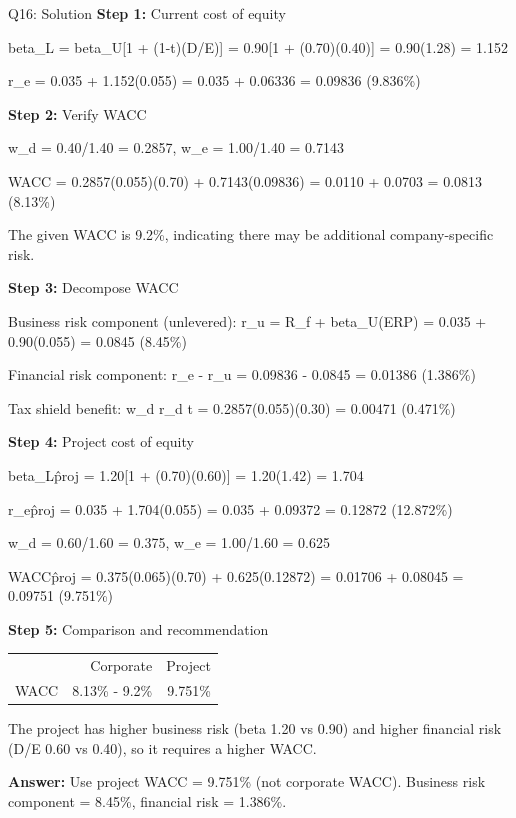 \documentclass{beamer}
\renewcommand{\scriptsize}{\fontsize{6pt}{7pt}\selectfont}
\begin{document}
	\begin{frame}{Q16: Solution}
		\scriptsize
		\textbf{Step 1:} Current cost of equity
		
		beta\_L = beta\_U[1 + (1-t)(D/E)] = 0.90[1 + (0.70)(0.40)] = 0.90(1.28) = 1.152
		
		r\_e = 0.035 + 1.152(0.055) = 0.035 + 0.06336 = 0.09836 (9.836\%)
		
		\vspace{2pt}
		\textbf{Step 2:} Verify WACC
		
		w\_d = 0.40/1.40 = 0.2857, w\_e = 1.00/1.40 = 0.7143
		
		WACC = 0.2857(0.055)(0.70) + 0.7143(0.09836) = 0.0110 + 0.0703 = 0.0813 (8.13\%)
		
		The given WACC is 9.2\%, indicating there may be additional company-specific risk.
		
		\vspace{2pt}
		\textbf{Step 3:} Decompose WACC
		
		Business risk component (unlevered): r\_u = R\_f + beta\_U(ERP) = 0.035 + 0.90(0.055) = 0.0845 (8.45\%)
		
		Financial risk component: r\_e - r\_u = 0.09836 - 0.0845 = 0.01386 (1.386\%)
		
		Tax shield benefit: w\_d r\_d t = 0.2857(0.055)(0.30) = 0.00471 (0.471\%)
		
		\vspace{2pt}
		\textbf{Step 4:} Project cost of equity
		
		beta\_L\^{proj} = 1.20[1 + (0.70)(0.60)] = 1.20(1.42) = 1.704
		
		r\_e\^{proj} = 0.035 + 1.704(0.055) = 0.035 + 0.09372 = 0.12872 (12.872\%)
		
		w\_d = 0.60/1.60 = 0.375, w\_e = 1.00/1.60 = 0.625
		
		WACC\^{proj} = 0.375(0.065)(0.70) + 0.625(0.12872) = 0.01706 + 0.08045 = 0.09751 (9.751\%)
		
		\vspace{2pt}
		\textbf{Step 5:} Comparison and recommendation
		
		\begin{tabular}{lrr}
			& Corporate & Project \\
			WACC & 8.13\% - 9.2\% & 9.751\% \\
		\end{tabular}
		
		The project has higher business risk (beta 1.20 vs 0.90) and higher financial risk (D/E 0.60 vs 0.40), so it requires a higher WACC.
		
		\textbf{Answer:} Use project WACC = 9.751\% (not corporate WACC). Business risk component = 8.45\%, financial risk = 1.386\%.
	\end{frame}
	
\end{document}
